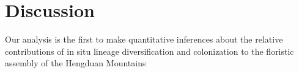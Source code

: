 \section{Discussion}

Our analysis is the first to make quantitative inferences about the relative contributions of in situ lineage diversification and colonization to the floristic assembly of the Hengduan Mountains